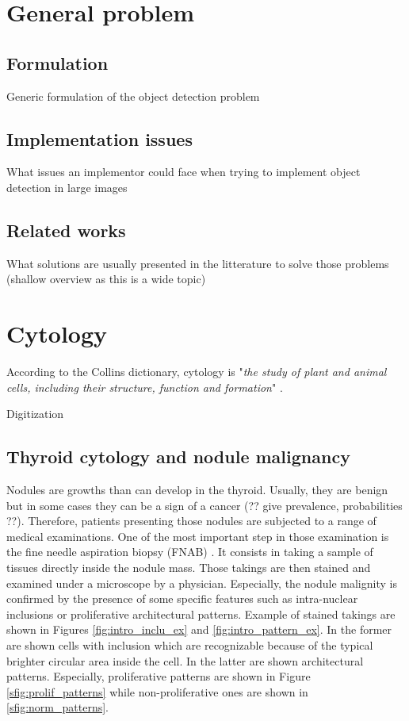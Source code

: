 \label{chap:context}
\section{General problem}
\subsection{Formulation}
Generic formulation of the object detection problem
\subsection{Implementation issues}
What issues an implementor could face when trying to implement object detection in large images
\subsection{Related works}
What solutions are usually presented in the litterature to solve those problems (shallow overview as this is a wide topic) 
\section{Cytology}
According to the Collins dictionary, cytology is "\textit{the study of plant and animal cells, including their structure, function and formation}" \cite{collins-cytology}. 

Digitization

\subsection{Thyroid cytology and nodule malignancy}
\label{ssec:intro_thyroid_case}
Nodules are growths than can develop in the thyroid. Usually, they are benign but in some cases they can be a sign of a cancer (?? give prevalence, probabilities ??). Therefore, patients presenting those nodules are subjected to a range of medical examinations. One of the most important step in those examination is the fine needle aspiration biopsy (FNAB) \cite{bomeli2010evaluation}. It consists in taking a sample of tissues directly inside the nodule mass. Those takings are then stained and examined under a microscope by a physician. Especially, the nodule malignity is confirmed by the presence of some specific features such as intra-nuclear inclusions or proliferative architectural patterns. Example of stained takings are shown in Figures \ref{fig:intro_inclu_ex} and \ref{fig:intro_pattern_ex}. In the former are shown cells with inclusion which are recognizable because of the typical brighter circular area inside the cell. In the latter are shown architectural patterns. Especially, proliferative patterns are shown in Figure \ref{sfig:prolif_patterns} while non-proliferative ones are shown in \ref{sfig:norm_patterns}. 

